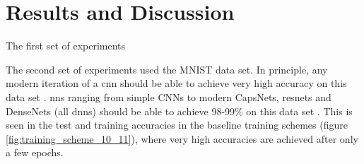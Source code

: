 \chapter{Results and Discussion}

The first set of experiments \bigskip

The second set of experiments used the MNIST data set. In principle, any modern iteration of a \gls{cnn} should be able to achieve very high accuracy on this data set \cite{sota_web}. \gls{nn}s ranging from simple CNNs to modern CapsNets, \gls{resnet}s and DenseNets (all \gls{dnn}s) should be able to achieve 98-99\% on this data set {\cite{mnist_sota_web}}. This is seen in the test and training accuracies in the baseline training schemes (figure \ref{fig:training_scheme_10_11}), where very high accuracies are achieved after only a few \gls{epoch}s. \bigskip


